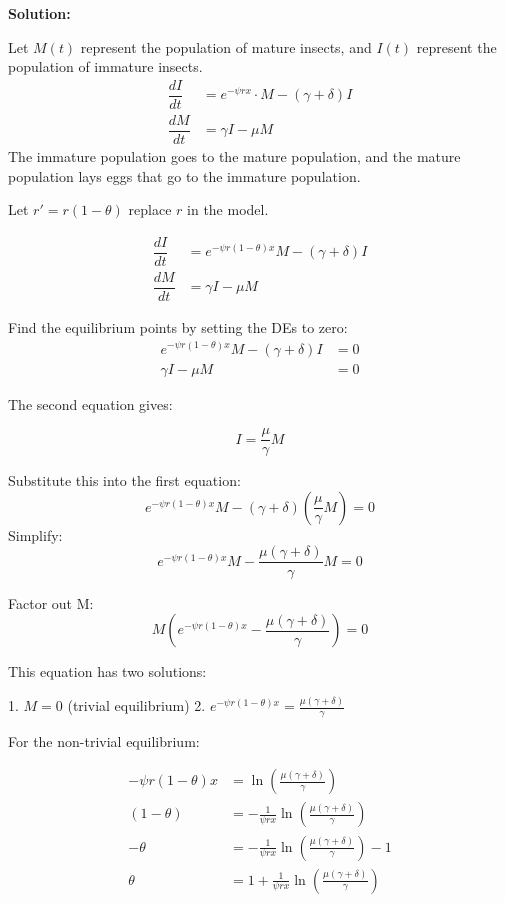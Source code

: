 \documentclass[12pt]{article}
\newenvironment{solution}{
    \textbf{Solution:}
    
}{
    
    \vspace{2em}
}
\begin{document}
\begin{solution}
    Let \( M(t) \) represent the population of mature insects, and \( I(t) \) represent the population of immature insects.
    \[
        \begin{aligned}
            \dfrac{dI}{dt} &= e^{-\psi r x} \cdot M - (\gamma + \delta) I \\
            \dfrac{dM}{dt} &= \gamma I - \mu M
        \end{aligned}
    \]
    The immature population goes to the mature population, and the mature population lays eggs that go to the immature population.

    Let \( r' = r(1 - \theta) \) replace \( r \) in the model.

    \[
    \begin{aligned}
        \dfrac{dI}{dt} &= e^{-\psi r(1 - \theta) x}  M - (\gamma + \delta) I \\
        \dfrac{dM}{dt} &= \gamma I - \mu M
    \end{aligned}
    \]

    Find the equilibrium points by setting the DEs to zero:
    \[
    \begin{aligned}
        e^{-\psi r(1 - \theta) x} M - (\gamma + \delta) I &= 0 \\
        \gamma I - \mu M &= 0
    \end{aligned}
    \]
 
    The second equation gives:

    \[
    I = \dfrac{\mu}{\gamma} M
    \]

    Substitute this into the first equation:
    \[
        e^{-\psi r(1 - \theta) x} M - (\gamma + \delta) \left( \dfrac{\mu}{\gamma} M \right ) = 0
    \]
    Simplify:
    \[
        e^{-\psi r(1 - \theta) x} M - \frac{\mu(\gamma + \delta)}{\gamma} M = 0
    \]
    
    Factor out M:
    \[
        M \left(e^{-\psi r(1 - \theta) x} - \frac{\mu(\gamma + \delta)}{\gamma}\right) = 0
    \]
    
    This equation has two solutions:
    
    1. \(M = 0\) (trivial equilibrium)
    2. \(e^{-\psi r(1 - \theta) x} = \frac{\mu(\gamma + \delta)}{\gamma}\)
    
    For the non-trivial equilibrium:
    
    \[
        \begin{aligned}
            -\psi r(1 - \theta) x &= \ln\left(\frac{\mu(\gamma + \delta)}{\gamma}\right) \\
            (1 - \theta) &= -\frac{1}{\psi rx} \ln\left(\frac{\mu(\gamma + \delta)}{\gamma}\right) \\
            -\theta &= -\frac{1}{\psi rx} \ln\left(\frac{\mu(\gamma + \delta)}{\gamma}\right) - 1 \\
            \theta &= 1 + \frac{1}{\psi rx} \ln\left(\frac{\mu(\gamma + \delta)}{\gamma}\right)
        \end{aligned}
    \]
    

\end{solution}
\end{document}
